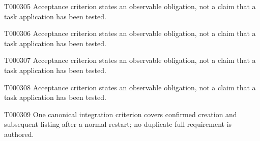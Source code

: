 \documentclass[11pt,a4paper]{article}
\begin{document}
\begin{atlasparagraph}{T000305}
Acceptance criterion states an observable obligation, not a claim that a task application has been tested.
\end{atlasparagraph}
\begin{atlasparagraph}{T000306}
Acceptance criterion states an observable obligation, not a claim that a task application has been tested.
\end{atlasparagraph}
\begin{atlasparagraph}{T000307}
Acceptance criterion states an observable obligation, not a claim that a task application has been tested.
\end{atlasparagraph}
\begin{atlasparagraph}{T000308}
Acceptance criterion states an observable obligation, not a claim that a task application has been tested.
\end{atlasparagraph}
\begin{atlasparagraph}{T000309}
One canonical integration criterion covers confirmed creation and subsequent listing after a normal restart; no duplicate full requirement is authored.
\end{atlasparagraph}
\end{document}
